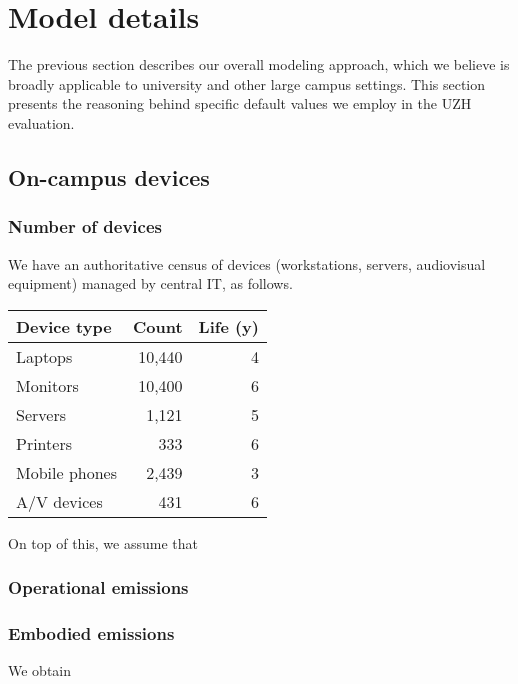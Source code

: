 \documentclass[11pt]{article}
\begin{document}
\section{Model details}
\label{sec:model:details}

The previous section describes our overall modeling approach, which we believe is broadly applicable to university and other large campus settings. This section presents the reasoning behind specific default values we employ in the UZH evaluation.

\subsection{On-campus devices}

\subsubsection*{Number of devices}

We have an authoritative census of devices (workstations, servers, audiovisual equipment) managed by central IT, as follows.

\begin{center}
  \begin{tabular}{|l|r|r|}
  \hline
  \textbf{Device type} & \textbf{Count} & \textbf{Life (y)}\\ \hline
  Laptops & 10,440 & 4 \\
  Monitors & 10,400 & 6 \\
  Servers & 1,121 & 5 \\
  Printers & 333 & 6 \\
  Mobile phones & 2,439 & 3 \\
  A/V devices & 431 & 6 \\ \hline
  \end{tabular}
  \label{tab:oncampusdevices}
\end{center}

On top of this, we assume that 

\subsubsection*{Operational emissions}

\subsubsection*{Embodied emissions}

We obtain 
\end{document}
